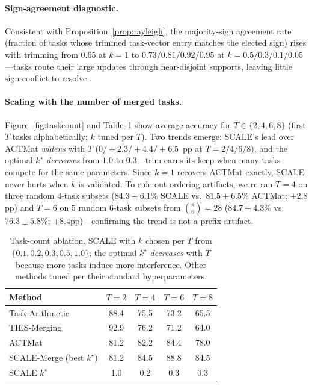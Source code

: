 \documentclass{article} %
\begin{document}
\paragraph{Sign-agreement diagnostic.} Consistent with Proposition~\ref{prop:rayleigh}, the majority-sign agreement rate (fraction of tasks whose trimmed task-vector entry matches the elected sign) rises with trimming from $0.65$ at $k{=}1$ to $0.73/0.81/0.92/0.95$ at $k{=}0.5/0.3/0.1/0.05$---tasks route their large updates through near-disjoint supports, leaving little sign-conflict to resolve \citep{yadav2023tiesmerging,wang2024localizing}.

\paragraph{Scaling with the number of merged tasks.} Figure~\ref{fig:taskcount} and Table~\ref{tab:taskcount_k} show average accuracy for $T\in\{2,4,6,8\}$ (first $T$ tasks alphabetically; $k$ tuned per $T$). Two trends emerge: SCALE's lead over ACTMat \emph{widens} with $T$ ($0/+2.3/+4.4/+6.5$~pp at $T{=}2/4/6/8$), and the optimal $k^\star$ \emph{decreases} from $1.0$ to $0.3$---trim earns its keep when many tasks compete for the same parameters. Since $k{=}1$ recovers ACTMat exactly, SCALE never hurts when $k$ is validated. To rule out ordering artifacts, we re-ran $T{=}4$ on three random 4-task subsets ($84.3{\pm}6.1\%$ SCALE vs.\ $81.5{\pm}6.5\%$ ACTMat; $+2.8$pp) and $T{=}6$ on $5$ random 6-task subsets from $\binom{8}{6}{=}28$ ($84.7{\pm}4.3\%$ vs.\ $76.3{\pm}5.8\%$; $+8.4$pp)---confirming the trend is not a prefix artifact.

\begin{table}[t]
\centering
\caption{Task-count ablation. SCALE with $k$ chosen per $T$ from $\{0.1, 0.2, 0.3, 0.5, 1.0\}$; the optimal $k^\star$ \emph{decreases} with $T$ because more tasks induce more interference. Other methods tuned per their standard hyperparameters.}
\label{tab:taskcount_k}
\footnotesize
\begin{tabular}{lcccc}
\toprule
Method & $T{=}2$ & $T{=}4$ & $T{=}6$ & $T{=}8$ \\
\midrule
Task Arithmetic             & 88.4 & 75.5 & 73.2 & 65.5 \\
TIES-Merging                & 92.9 & 76.2 & 71.2 & 64.0 \\
ACTMat                      & 81.2 & 82.2 & 84.4 & 78.0 \\
SCALE-Merge (best $k^\star$)  & 81.2 & 84.5 & 88.8 & 84.5 \\
\hspace*{1em}SCALE $k^\star$ & 1.0 & 0.2 & 0.3 & 0.3 \\
\bottomrule
\end{tabular}
\end{table}
\end{document}
